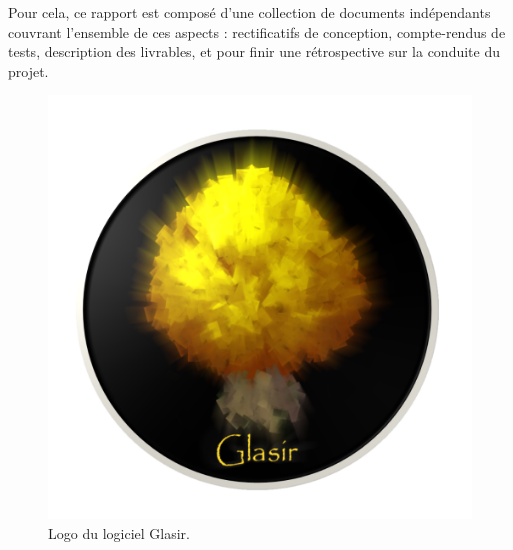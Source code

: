 Pour cela, ce rapport est composé d'une collection de documents indépendants couvrant l'ensemble de ces aspects : rectificatifs de conception, compte-rendus de tests, description des livrables, et pour finir une rétrospective sur la conduite du projet.

    \begin{figure}[!h]
        \centering
        \includegraphics[height=0.36\textwidth]{figure/glasir.png}
        \caption{Logo du logiciel Glasir.}
        \label{fig:glasir}
    \end{figure}